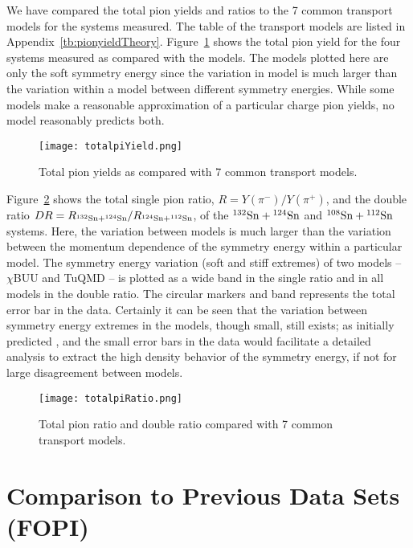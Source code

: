 We have compared the total pion yields and ratios to the 7 common transport models for the systems measured. The table of the transport models are listed in Appendix~\ref{tb:pionyieldTheory}. Figure~\ref{fig:totalpiYield} shows the total pion yield for the four systems measured as compared with the models. The models plotted here are only the soft symmetry energy since the variation in model is much larger than the variation within a model between different symmetry energies. While some models make a reasonable approximation of a particular charge pion yields, no model reasonably predicts both. 

\begin{figure}[!htb]
\centering
\texttt{[image: totalpiYield.png]}
\caption{Total pion yields as compared with 7 common transport models.}
\label{fig:totalpiYield}
\end{figure}

Figure~\ref{fig:totalpiRatio} shows the total single pion ratio, $R = Y(\pi^-)/Y(\pi^+)$, and the double ratio  $DR = R_{{}^{132}\mathrm{Sn} + {}^{124}\mathrm{Sn}}/R_{{}^{124}\mathrm{Sn} + {}^{112}\mathrm{Sn}}$, of the ${}^{132}\mathrm{Sn} + {}^{124}\mathrm{Sn}$ and ${}^{108}\mathrm{Sn} + {}^{112}\mathrm{Sn}$ systems. Here, the variation between models is much larger than the variation between the momentum dependence of the symmetry energy within a particular model. The symmetry energy variation (soft and stiff extremes) of two models -- $\chi$BUU and TuQMD -- is plotted as a wide band in the single ratio and in all models in the double ratio. The circular markers and band represents the total error bar in the data. Certainly it can be seen that the variation between symmetry energy extremes in the models, though small, still exists; as initially predicted \cite{baoan_piprod1,baoan_piprod2}, and the small error bars in the data would facilitate a detailed analysis to extract the high density behavior of the symmetry energy, if not for large disagreement between models. 



\begin{figure}[!htb]
\centering
\texttt{[image: totalpiRatio.png]}
\caption{Total pion ratio and double ratio compared with 7 common transport models.}
\label{fig:totalpiRatio}
\end{figure}




\section{Comparison to Previous Data Sets (FOPI)}


